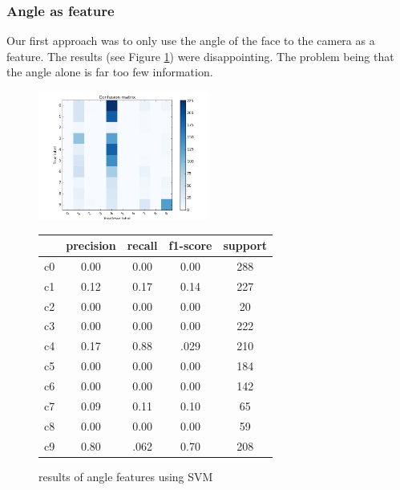 \documentclass[10pt,twocolumn,letterpaper]{article}
\begin{document}
	\subsubsection{Angle as feature}
	Our first approach was to only use the angle of the face to the camera as a feature. The results (see Figure \ref{headpose_feature}) were disappointing. The problem being that the angle alone is far too few information.
	\begin{figure}[h]
	\centering
	\includegraphics[width=0.5\textwidth]{angle_only}\hspace{0.01\textwidth}
	\begin{tabular}{c||c|c|c|c}
	  & precision&recall&f1-score&support\\	\hline
	 c0&0.00&0.00&0.00&288\\
	 c1&0.12&0.17&0.14&227\\
	 c2&0.00&0.00&0.00&20\\
	 c3&0.00&0.00&0.00&222\\
	 c4&0.17&0.88&.029&210\\
	 c5&0.00&0.00&0.00&184\\
	 c6&0.00&0.00&0.00&142\\
	 c7&0.09&0.11&0.10&65\\
	 c8&0.00&0.00&0.00&59\\
	 c9&0.80&.062&0.70&208
	\end{tabular}
	\caption{results of angle features using SVM}
	\label{headpose_feature}
	\end{figure}
\end{document}
